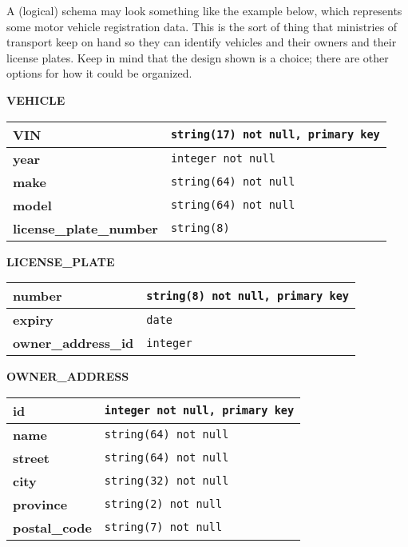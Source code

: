 \documentclass[a4paper]{report}
\begin{document}
A (logical) schema may look something like the example below, which represents some motor vehicle registration data. This is the sort of thing that ministries of transport keep on hand so they can identify vehicles and their owners and their license plates. Keep in mind that the design shown is a choice; there are other options for how it could be organized.
\vspace{1em}
\begin{center}
	\textbf{VEHICLE}\\
	\begin{tabular}{|l|l|}\hline
		\textbf{VIN} & \texttt{string(17) not null, primary key}\\ \hline		
		\textbf{year} & \texttt{integer not null}\\ \hline
		\textbf{make} & \texttt{string(64) not null}\\ \hline
		\textbf{model} & \texttt{string(64) not null}\\ \hline		
		\textbf{license\_plate\_number} & \texttt{string(8)}\\ \hline		
	\end{tabular}
	
	\textbf{LICENSE\_PLATE}\\
	\begin{tabular}{|l|l|}\hline
		\textbf{number} & \texttt{string(8) not null, primary key}\\ \hline
		\textbf{expiry} & \texttt{date} \\ \hline
		\textbf{owner\_address\_id} & \texttt{integer}\\ \hline		
	\end{tabular}
	
		\textbf{OWNER\_ADDRESS}\\
	\begin{tabular}{|l|l|}\hline
		\textbf{id} & \texttt{integer not null,  primary key}\\ \hline
		\textbf{name} & \texttt{string(64) not null}\\ \hline
		\textbf{street} & \texttt{string(64) not null}\\ \hline
		\textbf{city} & \texttt{string(32) not null}\\ \hline
		\textbf{province} & \texttt{string(2) not null}\\ \hline
		\textbf{postal\_code} & \texttt{string(7) not null}\\ \hline

	\end{tabular}
\end{center}
\end{document}
